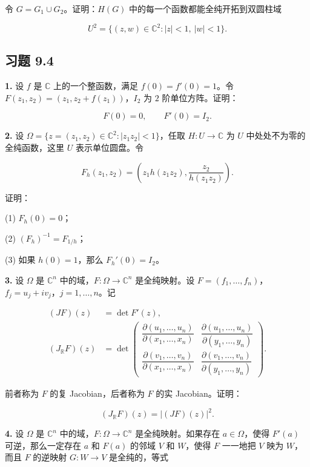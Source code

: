 \documentclass[11pt,a4paper]{article}
\begin{document}
令 \(G=G_1\cup G_2\)。证明：\(H(G)\)
中的每一个函数都能全纯开拓到双圆柱域

\[
U^2=\{(z,w)\in\mathbb C^2:|z|<1,\ |w|<1\}.
\]

\subsection{习题 9.4}\label{ch09-practice-heading-5}

\par{}
\noindent\textbf{1.} 设 \(f\) 是 \(\mathbb C\) 上的一个整函数，满足
\(f(0)=f'(0)=1\)。令 \(F(z_1,z_2)=(z_1,z_2+f(z_1))\)，\(I_2\) 为 \(2\)
阶单位方阵。证明：

\[
F(0)=0,\qquad F'(0)=I_2.
\]

\par{}
\noindent\textbf{2.} 设 \(\Omega=\{z=(z_1,z_2)\in\mathbb C^2:|z_1z_2|<1\}\)，任取
\(H:U\to\mathbb C\) 为 \(U\) 中处处不为零的全纯函数，这里 \(U\)
表示单位圆盘。令

\[
F_h(z_1,z_2)=\left(z_1h(z_1z_2),\frac{z_2}{h(z_1z_2)}\right).
\]

证明：

(1) \(F_h(0)=0\)；

(2) \((F_h)^{-1}=F_{1/h}\)；

(3) 如果 \(h(0)=1\)，那么 \(F_h'(0)=I_2\)。

\par{}
\noindent\textbf{3.} 设 \(\Omega\) 是 \(\mathbb C^n\)
中的域，\(F:\Omega\to\mathbb C^n\) 是全纯映射。设
\(F=(f_1,\ldots,f_n)\)，\(f_j=u_j+iv_j\)，\(j=1,\ldots,n\)。记

\[
\begin{aligned}
(JF)(z)&=\det F'(z),\\
(J_{\mathbb R}F)(z)&=
\det\begin{pmatrix}
\dfrac{\partial(u_1,\ldots,u_n)}{\partial(x_1,\ldots,x_n)}&
\dfrac{\partial(u_1,\ldots,u_n)}{\partial(y_1,\ldots,y_n)}\\[6pt]
\dfrac{\partial(v_1,\ldots,v_n)}{\partial(x_1,\ldots,x_n)}&
\dfrac{\partial(v_1,\ldots,v_n)}{\partial(y_1,\ldots,y_n)}
\end{pmatrix}.
\end{aligned}
\]

前者称为 \(F\) 的复 Jacobian，后者称为 \(F\) 的实 Jacobian。证明：

\[
(J_{\mathbb R}F)(z)=|(JF)(z)|^2.
\]

\par{}
\noindent\textbf{4.} 设 \(\Omega\) 是 \(\mathbb C^n\)
中的域，\(F:\Omega\to\mathbb C^n\) 是全纯映射。如果存在
\(a\in\Omega\)，使得 \(F'(a)\) 可逆，那么一定存在 \(a\) 和 \(F(a)\)
的邻域 \(V\) 和 \(W\)，使得 \(F\) 一一地把 \(V\) 映为 \(W\)，而且 \(F\)
的逆映射 \(G:W\to V\) 是全纯的，等式
\end{document}
